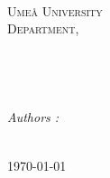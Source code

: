 \begin{titlepage}

\begin{center}



~\\
~\\
~\\
\textsc{\LARGE Ume\aa{} University}\\[1cm]

\textsc{\Large {\filiere{} Department, \annee}}\\[0.5cm]

\HRule \\[0.4cm]
{ \LARGE \bfseries \titre \\ \huge \soustitre}\\[0.4cm]

\HRule \\[0.5cm]

\emph{Authors :}\\
\equipe
~\\

\vfill

{\large \today}

\end{center}

\end{titlepage}
